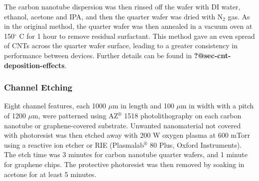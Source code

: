 \documentclass[
  letterpaper,
  DIV=11,
  numbers=noendperiod]{scrartcl}
\begin{document}
The carbon nanotube dispersion was then rinsed off the wafer with DI
water, ethanol, acetone and IPA, and then the quarter wafer was dried
with N\(_2\) gas. As in the original method, the quarter wafer was then
annealed in a vacuum oven at 150\(^\circ\) C for 1 hour to remove
residual surfactant. This method gave an even spread of CNTs across the
quarter wafer surface, leading to a greater consistency in performance
between devices. Further details can be found in
\textbf{?@sec-cnt-deposition-effects}.

\hypertarget{channel-etching}{%
\subsubsection{Channel Etching}\label{channel-etching}}

Eight channel features, each 1000 \(\mu\)m in length and 100 \(\mu\)m in
width with a pitch of 1200 \(\mu\)m, were patterned using
AZ\(^\circledR\) 1518 photolithography on each carbon nanotube or
graphene-covered substrate. Unwanted nanomaterial not covered with
photoresist was then etched away with 200 W oxygen plasma at 600 mTorr
using a reactive ion etcher or RIE (Plasmalab\(^\circledR\) 80 Plus,
Oxford Instruments). The etch time was 3 minutes for carbon nanotube
quarter wafers, and 1 minute for graphene chips. The protective
photoresist was then removed by soaking in acetone for at least 5
minutes.
\end{document}
